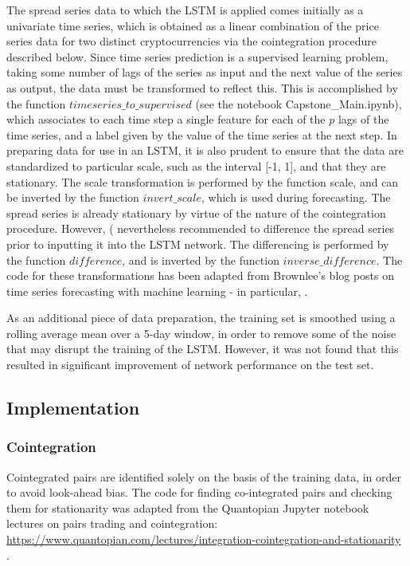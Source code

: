 \documentclass{article}
\begin{document}
The spread series data to which the LSTM is applied comes initially as a univariate time series, which is obtained as a linear combination of the price series data for two distinct cryptocurrencies via the cointegration procedure described below. Since time series prediction is a supervised learning problem, taking some number of lags of the series as input and the next value of the series as output, the data must be transformed to reflect this. This is accomplished by the function $timeseries\_to\_supervised$ (see the notebook Capstone\_Main.ipynb), which associates to each time step a single feature for each of the $p$ lags of the time series, and a label given by the value of the time series at the next step. In preparing data for use in an LSTM, it is also prudent to ensure that the data are standardized to particular scale, such as the interval [-1, 1], and that they are stationary. The scale transformation is performed by the function scale, and can be inverted by the function $invert\_scale$, which is used during forecasting. The spread series is already stationary by virtue of the nature of the cointegration procedure. However, ( \cite{dunis2006modelling} nevertheless recommended to difference the spread series prior to inputting it into the LSTM network. The differencing is performed by the function $difference$, and is inverted by the function $inverse\_difference$. The code for these transformations has been adapted from Brownlee's blog posts on time series forecasting with machine learning - in particular, \cite{brownlee2016time}. 

As an additional piece of data preparation, the training set is smoothed using a rolling average mean over a 5-day window, in order to remove some of the noise that may disrupt the training of the LSTM. However, it was not found that this resulted in significant improvement of network performance on the test set. 

\subsection{Implementation}

\subsubsection{Cointegration}

Cointegrated pairs are identified solely on the basis of the training data, in order to avoid look-ahead bias. The code for finding co-integrated pairs and checking them for stationarity was adapted from the Quantopian Jupyter notebook lectures on pairs trading and cointegration: \url{https://www.quantopian.com/lectures/integration-cointegration-and-stationarity} \cite{quantopian_cointegration}.
\end{document}
